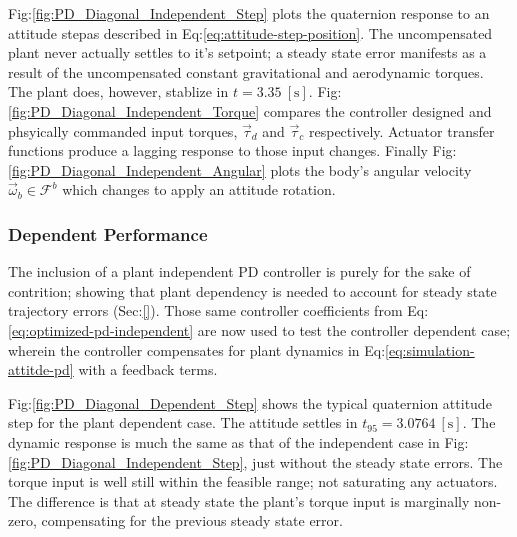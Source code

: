 Fig:\ref{fig:PD_Diagonal_Independent_Step} plots the quaternion response to an attitude stepas  described in Eq:\ref{eq:attitude-step-position}. The uncompensated plant never actually settles to it's setpoint; a steady state error manifests as a result of the uncompensated constant gravitational and aerodynamic torques. The plant does, however, stablize in $t = 3.35~[\text{s}]$. Fig:\ref{fig:PD_Diagonal_Independent_Torque} compares the controller designed and phsyically commanded input torques, $\vec{\tau}_d$ and $\vec{\tau}_c$ respectively. Actuator transfer functions produce a lagging response to those input changes. Finally Fig:\ref{fig:PD_Diagonal_Independent_Angular} plots the body's angular velocity $\vec{\omega}_b\in\mathcal{F}^{b}$ which changes to apply an attitude rotation.
\subsubsection{Dependent Performance}
\label{subsubsec:simulation.atttiude.pd.dependent}
The inclusion of a plant independent PD controller is purely for the sake of contrition; showing that plant dependency is needed to account for steady state trajectory errors (Sec:\ref{}). Those same controller coefficients from Eq:\ref{eq:optimized-pd-independent} are now used to test the controller dependent case; wherein the controller compensates for plant dynamics in Eq:\ref{eq:simulation-attitde-pd} with a feedback terms.
\par
Fig:\ref{fig:PD_Diagonal_Dependent_Step} shows the typical quaternion attitude step for the plant dependent case. The attitude settles in $t_{95}=3.0764~[\text{s}]$. The dynamic response is much the same as that of the independent case in Fig:\ref{fig:PD_Diagonal_Independent_Step}, just without the steady state errors. The torque input is well still within the feasible range; not saturating any actuators. The difference is that at steady state the plant's torque input is marginally non-zero, compensating for the previous steady state error.
\par
